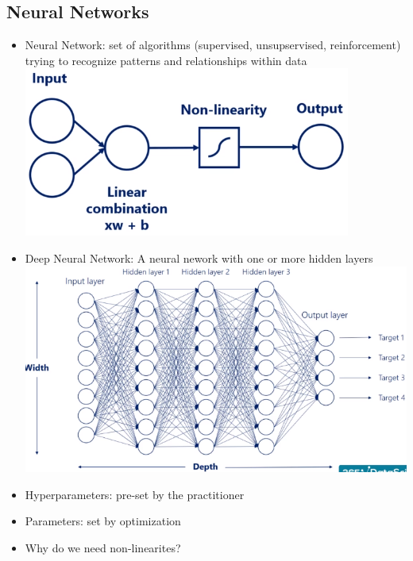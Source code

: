 \documentclass{article}
\begin{document}
\begin{multicols*}{3}
        \section{Neural Networks}
    \renewcommand\labelitemi{{\boldmath$\cdot$}}
    \begin{itemize}[noitemsep]
        \item Neural Network: set of algorithms (supervised, unsupservised, reinforcement) 
        trying to recognize patterns and relationships within data \\
        \includegraphics[width=\linewidth]{neural_network_architecture} \\
        \item Deep Neural Network: A neural nework with one or more hidden layers \\
        \includegraphics[width=\linewidth]{deep_neural_network2} \\
        \item Hyperparameters: pre-set by the practitioner
        \item Parameters: set by optimization
        \item Why do we need non-linearites?

\end{itemize}
\end{multicols*}
\end{document}

